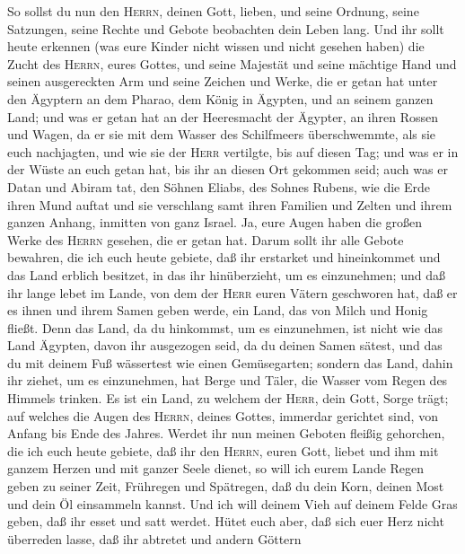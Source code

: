  So sollst du nun den \textsc{Herrn}, deinen Gott, lieben,
und seine Ordnung, seine Satzungen, seine Rechte und Gebote beobachten
dein Leben lang.  Und ihr sollt heute erkennen (was eure
Kinder nicht wissen und nicht gesehen haben) die Zucht des
\textsc{Herrn}, eures Gottes, und seine Majestät und seine mächtige Hand
und seinen ausgereckten Arm  und seine Zeichen und Werke,
die er getan hat unter den Ägyptern an dem Pharao, dem König in Ägypten,
und an seinem ganzen Land;  und was er getan hat an der
Heeresmacht der Ägypter, an ihren Rossen und Wagen, da er sie mit dem
Wasser des Schilfmeers überschwemmte, als sie euch nachjagten, und wie
sie der \textsc{Herr} vertilgte, bis auf diesen Tag;  und
was er in der Wüste an euch getan hat, bis ihr an diesen Ort gekommen
seid;  auch was er Datan und Abiram tat, den Söhnen
Eliabs, des Sohnes Rubens, wie die Erde ihren Mund auftat und sie
verschlang samt ihren Familien und Zelten und ihrem ganzen Anhang,
inmitten von ganz Israel.  Ja, eure Augen haben die großen
Werke des \textsc{Herrn} gesehen, die er getan hat.  Darum
sollt ihr alle Gebote bewahren, die ich euch heute gebiete, daß ihr
erstarket und hineinkommet und das Land erblich besitzet, in das ihr
hinüberzieht, um es einzunehmen;  und daß ihr lange lebet
im Lande, von dem der \textsc{Herr} euren Vätern geschworen hat, daß er
es ihnen und ihrem Samen geben werde, ein Land, das von Milch und Honig
fließt.  Denn das Land, da du hinkommst, um es
einzunehmen, ist nicht wie das Land Ägypten, davon ihr ausgezogen seid,
da du deinen Samen sätest, und das du mit deinem Fuß wässertest wie
einen Gemüsegarten;  sondern das Land, dahin ihr ziehet,
um es einzunehmen, hat Berge und Täler, die Wasser vom Regen des Himmels
trinken.  Es ist ein Land, zu welchem der \textsc{Herr},
dein Gott, Sorge trägt; auf welches die Augen des \textsc{Herrn}, deines
Gottes, immerdar gerichtet sind, von Anfang bis Ende des Jahres.
 Werdet ihr nun meinen Geboten fleißig gehorchen, die ich
euch heute gebiete, daß ihr den \textsc{Herrn}, euren Gott, liebet und
ihm mit ganzem Herzen und mit ganzer Seele dienet,  so
will ich eurem Lande Regen geben zu seiner Zeit, Frühregen und
Spätregen, daß du dein Korn, deinen Most und dein Öl einsammeln kannst.
 Und ich will deinem Vieh auf deinem Felde Gras geben,
daß ihr esset und satt werdet.  Hütet euch aber, daß sich
euer Herz nicht überreden lasse, daß ihr abtretet und andern Göttern
